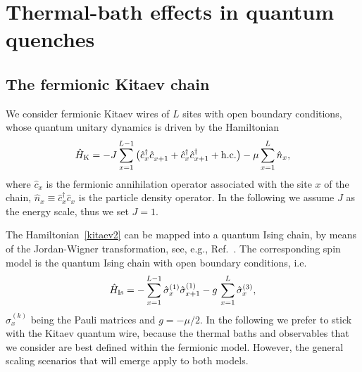 \section{Thermal-bath effects in quantum quenches}

\label{modbath}

\subsection{The fermionic Kitaev chain}
\label{kitaevmod}

We consider fermionic Kitaev wires of $L$ sites with open boundary
conditions, whose quantum unitary dynamics is driven by the
Hamiltonian~\cite{Kitaev-01}
\begin{equation}
  \hat H_{\rm K} = - J \sum_{x=1}^{L-1} \big( \hat c_x^\dagger \hat
  c_{x+1}^{\phantom\dagger} +
  \hat c_x^\dagger \hat c_{x+1}^\dagger+{\rm h.c.}
  \big) - \mu \sum_{x=1}^L \hat n_x ,
  \label{kitaev2}
\end{equation}
where $\hat c_x$ is the fermionic annihilation operator associated
with the site $x$ of the chain, $\hat n_x\equiv \hat
c_x^\dagger \hat c_x^{\phantom\dagger}$ is the particle density
operator.  In the following we assume $J$ as the energy scale, thus we
set $J=1$.

The Hamiltonian~\eqref{kitaev2} can be mapped into a quantum Ising
chain, by means of the Jordan-Wigner transformation, see, e.g.,
Ref.~\cite{Sachdev-book}.  The corresponding spin model is the
quantum Ising chain with open boundary conditions, i.e.
\begin{equation}
  \hat H_{\rm Is} = -\sum_{x=1}^{L-1} \hat \sigma^{(1)}_x \hat
  \sigma^{(1)}_{x+1} - g\, \sum_{x=1}^L \hat \sigma^{(3)}_x,
  \label{isham}
\end{equation}
$\hat \sigma^{(k)}_x$ being the Pauli matrices and $g=-\mu/2$.  In the
following we prefer to stick with the Kitaev quantum wire, because the
thermal baths and observables that we consider are best defined within
the fermionic model. However, the general scaling scenarios that will
emerge apply to both models.

